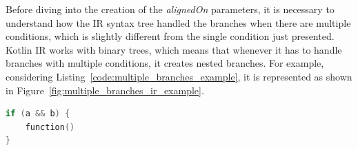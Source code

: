 Before diving into the creation of the \textit{alignedOn} parameters, it is necessary to understand how the IR syntax tree handled the branches when there are multiple conditions, which is slightly different from the single condition just presented. Kotlin IR works with binary trees, which means that whenever it has to handle branches with multiple conditions, it creates nested branches.\newline
For example, considering Listing~\ref{code:multiple_branches_example}, it is represented as shown in Figure~\ref{fig:multiple_branches_ir_example}.
\begin{lstlisting}[caption={Example of code where a branch has multiple conditions}, captionpos=b, language=Kotlin, label={code:multiple_branches_example}]
if (a && b) {
    function()
}
\end{lstlisting}

